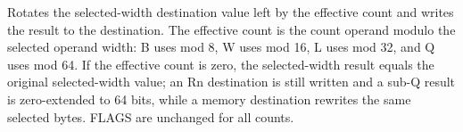 Rotates the selected-width destination value left by the effective count and writes the result to the destination. The effective count is the count operand modulo the selected operand width: B uses mod 8, W uses mod 16, L uses mod 32, and Q uses mod 64. If the effective count is zero, the selected-width result equals the original selected-width value; an Rn destination is still written and a sub-Q result is zero-extended to 64 bits, while a memory destination rewrites the same selected bytes. FLAGS are unchanged for all counts.
